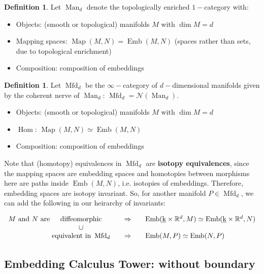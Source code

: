 \documentclass{amsart}
\DeclareMathOperator{\Emb}{Emb}
\DeclareMathOperator{\Mfd}{Mfd}
\DeclareMathOperator{\Hom}{Hom}
\DeclareMathOperator{\Map}{Map}
\DeclareMathOperator{\Man}{Man}
\theoremstyle{definition}
\newtheorem{definition}[theorem]{Definition}
\theoremstyle{remark}
\theoremstyle{example}
\begin{document}
\begin{definition}
    Let $\Man_d$ denote the topologically enriched $1-$category with:
    \begin{itemize}
        \item Objects: (smooth or topological) manifolds $M$ with $\dim M = d$
        \item Mapping spaces: $\Map(M,N) = \Emb(M,N)$ (spaces rather than sets, due to topological enrichment)
        \item Composition: composition of embeddings
    \end{itemize}
\end{definition}

\begin{definition}
    Let $\Mfd_d$ be the $\infty-$category of $d-$dimensional manifolds given by the coherent nerve of $\Man_d$: $\Mfd_d = \mathcal{N}(\Man_d)$.
    \begin{itemize}
        \item Objects: (smooth or topological) manifolds $M$ with $\dim M = d$
        \item $\Hom$: $\Map(M,N) \simeq \Emb(M,N)$
        \item Composition: composition of embeddings
    \end{itemize}
\end{definition}

Note that (homotopy) equivalences in $\Mfd_d$ are \textbf{isotopy equivalences}, since the mapping spaces are embedding spaces and homotopies between morphisms here are paths inside $\Emb(M,N)$, i.e. isotopies of embeddings. Therefore, embedding spaces are isotopy invariant. So, for another manifold $P \in \Mfd_d$, we can add the following in our heirarchy of invariants:


\[
\begin{array}{r@{\;}c@{\qquad}c@{\qquad}l}
    M\text{ and }N\text{ are} & \text{diffeomorphic}
        & \Rightarrow & \Emb(\underbar{k} \times \mathbb{R}^d, M) \simeq \Emb(\underbar{k} \times \mathbb{R}^d, N) \\
    & \cup & & \\
    & \text{equivalent in } \Mfd_d
        & \Rightarrow & \Emb(M, P) \simeq \Emb(N, P)
\end{array}
\]

\subsection{Embedding Calculus Tower: without boundary}
\end{document}
